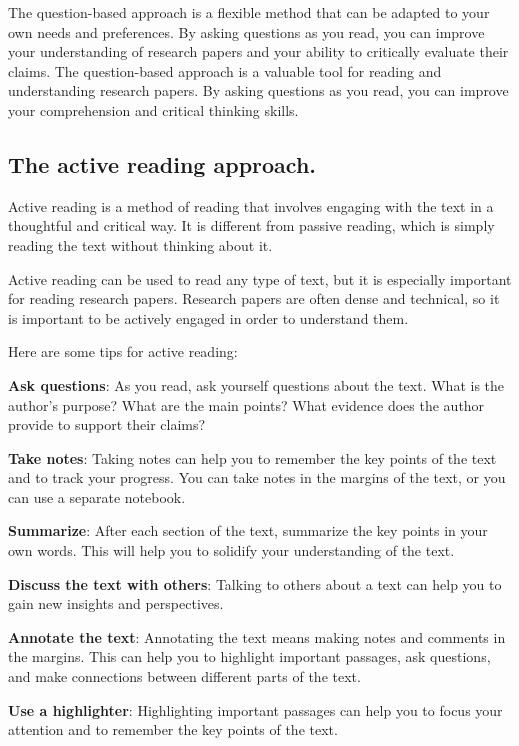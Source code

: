 \documentclass[
  b5paper]{book}
\begin{document}
The question-based approach is a flexible method that can be adapted to your own needs and preferences. By asking questions as you read, you can improve your understanding of research papers and your ability to critically evaluate their claims. The question-based approach is a valuable tool for reading and understanding research papers. By asking questions as you read, you can improve your comprehension and critical thinking skills.

\hypertarget{the-active-reading-approach.}{%
\subsection*{The active reading approach.}\label{the-active-reading-approach.}}

Active reading is a method of reading that involves engaging with the text in a thoughtful and critical way. It is different from passive reading, which is simply reading the text without thinking about it.

Active reading can be used to read any type of text, but it is especially important for reading research papers. Research papers are often dense and technical, so it is important to be actively engaged in order to understand them.

Here are some tips for active reading:

\textbf{Ask questions}: As you read, ask yourself questions about the text. What is the author's purpose? What are the main points? What evidence does the author provide to support their claims?

\textbf{Take notes}: Taking notes can help you to remember the key points of the text and to track your progress. You can take notes in the margins of the text, or you can use a separate notebook.

\textbf{Summarize}: After each section of the text, summarize the key points in your own words. This will help you to solidify your understanding of the text.

\textbf{Discuss the text with others}: Talking to others about a text can help you to gain new insights and perspectives.

\textbf{Annotate the text}: Annotating the text means making notes and comments in the margins. This can help you to highlight important passages, ask questions, and make connections between different parts of the text.

\textbf{Use a highlighter}: Highlighting important passages can help you to focus your attention and to remember the key points of the text.
\end{document}
